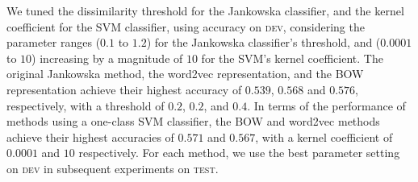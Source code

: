 \documentclass[11pt]{article}
\newcommand\dev{\textsc{dev}\xspace}
\newcommand\test{\textsc{test}\xspace}
\begin{document}
We tuned the dissimilarity threshold for the Jankowska classifier, and
the kernel coefficient for the SVM classifier, using accuracy on \dev,
considering the parameter ranges ($0.1$ to $1.2$) for the Jankowska
classifier's threshold, and ($0.0001$ to $10$) increasing by a
magnitude of $10$ for the SVM's kernel coefficient. The original
Jankowska method, the word2vec representation, and the BOW
representation achieve their highest accuracy of $0.539$, $0.568$ and
$0.576$, respectively, with a threshold of $0.2$, $0.2$, and $0.4$. In
terms of the performance of methods using a one-class SVM classifier,
the BOW and word2vec methods achieve their highest accuracies of
$0.571$ and $0.567$, with a kernel coefficient of $0.0001$ and $10$
respectively. For each method, we use the best parameter setting on
\dev in subsequent experiments on \test.




\end{document}
